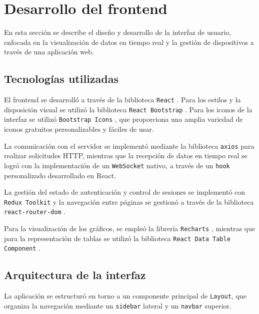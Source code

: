 \section{Desarrollo del frontend}

En esta sección se describe el diseño y desarrollo de la interfaz de usuario,
enfocada en la visualización de datos en tiempo real y la gestión de
dispositivos a través de una aplicación web.

\subsection{Tecnologías utilizadas}

El frontend se desarrolló a través de la biblioteca \texttt{React}
\cite{React}. Para los estilos y la disposición visual se utilizó la biblioteca
\texttt{React Bootstrap} \cite{ReactBootstrap}. %
Para los iconos de la interfaz se utilizó \texttt{Bootstrap Icons}
\cite{BootstrapIcons}, que proporciona una amplia variedad de iconos gratuitos
personalizables y fáciles de usar.

La comunicación con el servidor se implementó mediante la biblioteca
\texttt{axios} \cite{Axios} para realizar solicitudes HTTP, mientras que la
recepción de datos en tiempo real se logró con la implementación de un
\texttt{WebSocket} nativo, a través de un \texttt{hook} personalizado
desarrollado en React.

La gestión del estado de autenticación y control de sesiones se implementó con
\texttt{Redux Toolkit} \cite{ReduxToolkit} y la navegación entre páginas se
gestionó a través de la biblioteca \texttt{react-router-dom}
\cite{ReactRouter}.

Para la visualización de los gráficos, se empleó la librería \texttt{Recharts}
\cite{Recharts}, mientras que para la representación de tablas se utilizó la
biblioteca \texttt{React Data Table Component} \cite{ReactDataTable}.

\subsection{Arquitectura de la interfaz}

La aplicación se estructuró en torno a un componente principal de
\texttt{Layout}, que organiza la navegación mediante un \texttt{sidebar}
lateral y un \texttt{navbar} superior.

